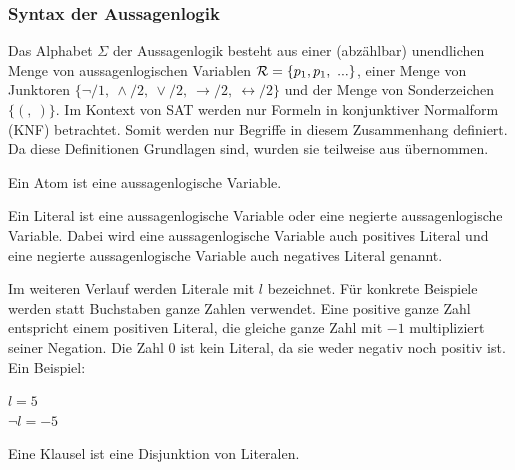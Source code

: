 \subsubsection{Syntax der Aussagenlogik}
Das Alphabet $\Sigma$ der Aussagenlogik besteht aus 
einer (abzählbar) unendlichen Menge von 
aussagenlogischen Variablen ${\cal R} = \{p_1,p_1,\ ...\}$, 
einer Menge von Junktoren 
$\{\neg /1,\ \wedge /2,\ \vee /2,\ \rightarrow /2,\ \leftrightarrow /2\}$
und der Menge von Sonderzeichen $\{(,\ )\}$. Im Kontext
von SAT werden nur Formeln in konjunktiver Normalform
(KNF) betrachtet. Somit werden nur Begriffe in diesem 
Zusammenhang definiert. Da diese Definitionen Grundlagen
sind, wurden sie teilweise aus \cite{hoell:2009} übernommen.

  \begin{definition}
    Ein Atom ist eine aussagenlogische Variable.
   \end{definition}
  \begin{definition}
    Ein Literal ist eine aussagenlogische Variable oder
    eine negierte aussagenlogische Variable. Dabei wird
    eine aussagenlogische Variable auch positives Literal
    und eine negierte aussagenlogische Variable auch
    negatives Literal genannt.
  \end{definition}
  Im weiteren Verlauf werden
  Literale mit $l$ bezeichnet. Für konkrete Beispiele
  werden statt Buchstaben ganze Zahlen verwendet. Eine
  positive ganze Zahl entspricht einem positiven Literal,
  die gleiche ganze Zahl mit $-1$ multipliziert seiner
  Negation. Die Zahl 0 ist kein Literal, da sie weder
  negativ noch positiv ist. Ein Beispiel: 
  \begin{center}
    $l = 5$\\
    $\neg l = -5$
  \end{center}


  \begin{definition}
    Eine Klausel ist eine Disjunktion von Literalen.
  \end{definition}

